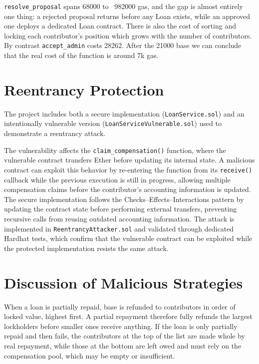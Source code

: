 \texttt{resolve\_proposal} spans 68000 to ~982000 gas, and the gap is almost entirely one thing: a rejected proposal returns before any Loan exists, while an approved one deploys a dedicated Loan contract. There is also the cost of sorting and locking each contributor's position which grows with the number of contributors. By contrast \texttt{accept\_admin} costs 28262. After the 21000 base we can conclude that the real cost of the function is around 7k gas.

\section{Reentrancy Protection}

The project includes both a secure implementation (\texttt{LoanService.sol}) and an intentionally vulnerable version (\texttt{LoanServiceVulnerable.sol}) used to demonstrate a reentrancy attack.

The vulnerability affects the \texttt{claim\_compensation()} function, where the vulnerable contract transfers Ether before updating its internal state. A malicious contract can exploit this behavior by re-entering the function from its \texttt{receive()} callback while the previous execution is still in progress, allowing multiple compensation claims before the contributor's accounting information is updated.
The secure implementation follows the Checks--Effects--Interactions pattern by updating the contract state before performing external transfers, preventing recursive calls from reusing outdated accounting information.
The attack is implemented in \texttt{ReentrancyAttacker.sol} and validated through dedicated Hardhat tests, which confirm that the vulnerable contract can be exploited while the protected implementation resists the same attack.

\section{Discussion of Malicious Strategies}

When a loan is partially repaid, base is refunded to contributors in order of locked value, highest first. A partial repayment therefore fully refunds the largest lockholders before smaller ones receive anything. If the loan is only partially repaid and then fails, the contributors at the top of the list are made whole by real repayment, while those at the bottom are left owed and must rely on the compensation pool, which may be empty or insufficient.

